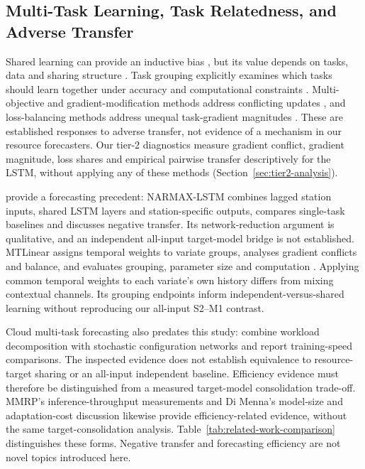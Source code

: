 \documentclass[5p,twocolumn]{elsarticle}
\begin{document}
\subsection{Multi-Task Learning, Task Relatedness, and Adverse Transfer}
\label{sec:rw-multitask}

Shared learning can provide an inductive bias \citep{Caruana1997Multitask},
but its value depends on tasks, data and sharing structure
\citep{Yu2025MultitaskFundamentals}. Task grouping explicitly examines which
tasks should learn together under accuracy and computational constraints
\citep{Standley2020TaskGrouping,Fifty2021TaskGroupings}.
Multi-objective and gradient-modification methods address conflicting updates
\citep{Sener2018MultiObjective,Yu2020GradientSurgery}, and loss-balancing
methods address unequal task-gradient magnitudes \citep{Chen2018GradNorm}.
These are established responses to adverse transfer, not evidence of a
mechanism in our resource forecasters. Our tier-2 diagnostics measure
gradient conflict, gradient magnitude, loss shares and empirical pairwise
transfer descriptively for the LSTM, without applying any of these methods
(Section~\ref{sec:tier2-analysis}).

\citet{Nikentari2022NARMAXLSTM} provide a forecasting precedent:
NARMAX-LSTM combines lagged station inputs, shared LSTM layers and
station-specific outputs, compares single-task baselines and discusses
negative transfer. Its network-reduction argument is qualitative,
and an independent all-input target-model bridge is not established.
MTLinear assigns temporal weights to variate groups, analyses gradient
conflicts and balance, and evaluates grouping, parameter size and computation
\citep{Nochumsohn2025MTLinear}. Applying common temporal weights to each
variate's own history differs from mixing contextual channels. Its grouping
endpoints inform independent-versus-shared learning without reproducing our
all-input S2--M1 contrast.

Cloud multi-task forecasting also predates this study:
\citet{Bi2019CloudMultitask} combine workload decomposition with stochastic
configuration networks and report training-speed comparisons. The inspected
evidence does not establish equivalence to resource-target sharing or an
all-input independent baseline. Efficiency evidence must therefore be
distinguished from a measured target-model consolidation trade-off.
MMRP's inference-throughput measurements and Di Menna's model-size and
adaptation-cost discussion likewise provide efficiency-related evidence,
without the same target-consolidation analysis.
Table~\ref{tab:related-work-comparison} distinguishes these forms.
Negative transfer and forecasting efficiency are not novel topics introduced here.
\end{document}
